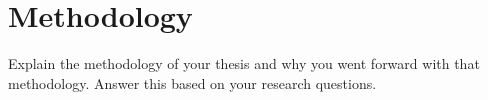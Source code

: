 \chapter{Methodology}

Explain the methodology of your thesis and why you went forward with that methodology. Answer this based on your research questions.
